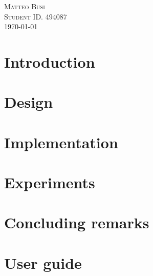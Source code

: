 \documentclass[12pt, oneside, a4paper]{article}
\begin{document}
\begin{titlepage}
		\Large %
		\textsc{Matteo Busi}\\[0.4cm]%
		\large
		\textsc{Student ID. 494087}\\[3cm]
		
		
		{\large \today}\\[2cm] %
		
		
		
		
		\vfill %
		
	\end{titlepage}

	\section{Introduction} \label{sec:intro}
		
		
	\section{Design} \label{sec:design}
		
		
	\section{Implementation} \label{sec:implementation}
		
			
	\section{Experiments} \label{sec:experiments}
		

	\section{Concluding remarks} \label{sec:conclusions}
		
	
	\section{User guide} \label{sec:guide}
		

	
\end{document}
